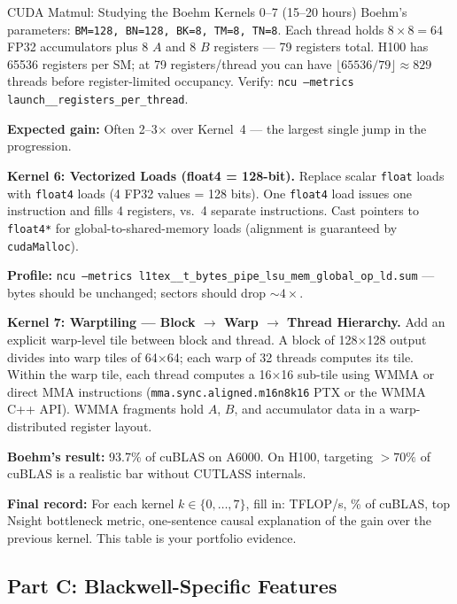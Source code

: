 \begin{exercise}{CUDA Matmul: Studying the Boehm Kernels 0--7 (15--20 hours)}
Boehm's parameters: \texttt{BM=128, BN=128, BK=8, TM=8, TN=8}. Each thread holds $8 \times 8 = 64$ FP32 accumulators plus 8 $A$ and 8 $B$ registers --- 79 registers total. H100 has 65536 registers per SM; at 79 registers/thread you can have $\lfloor 65536 / 79 \rfloor \approx 829$ threads before register-limited occupancy. Verify: \texttt{ncu --metrics launch\_\_registers\_per\_thread}.

\textbf{Expected gain:} Often 2--3$\times$ over Kernel~4 --- the largest single jump in the progression.

\medskip
\textbf{Kernel 6: Vectorized Loads (float4 = 128-bit).}
Replace scalar \texttt{float} loads with \texttt{float4} loads (4 FP32 values = 128 bits). One \texttt{float4} load issues one instruction and fills 4 registers, vs.\ 4 separate instructions. Cast pointers to \texttt{float4*} for global-to-shared-memory loads (alignment is guaranteed by \texttt{cudaMalloc}).

\textbf{Profile:} \texttt{ncu --metrics l1tex\_\_t\_bytes\_pipe\_lsu\_mem\_global\_op\_ld.sum} --- bytes should be unchanged; sectors should drop $\sim 4\times$.

\medskip
\textbf{Kernel 7: Warptiling --- Block $\to$ Warp $\to$ Thread Hierarchy.}
Add an explicit warp-level tile between block and thread. A block of 128$\times$128 output divides into warp tiles of 64$\times$64; each warp of 32 threads computes its tile. Within the warp tile, each thread computes a 16$\times$16 sub-tile using WMMA or direct MMA instructions (\texttt{mma.sync.aligned.m16n8k16} PTX or the WMMA C++ API). WMMA fragments hold $A$, $B$, and accumulator data in a warp-distributed register layout.

\textbf{Boehm's result:} 93.7\% of cuBLAS on A6000. On H100, targeting $>70\%$ of cuBLAS is a realistic bar without CUTLASS internals.

\textbf{Final record:} For each kernel $k \in \{0, \ldots, 7\}$, fill in: TFLOP/s, \% of cuBLAS, top Nsight bottleneck metric, one-sentence causal explanation of the gain over the previous kernel. This table is your portfolio evidence.
\end{exercise}

\subsection{Part C: Blackwell-Specific Features}

